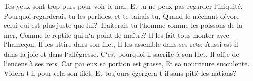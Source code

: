 \verse Tes yeux sont trop purs pour voir le mal, Et tu ne peux pas regarder l`iniquité. Pourquoi regarderais-tu les perfides, et te tairais-tu, Quand le méchant dévore celui qui est plus juste que lui? 
\verse Traiterais-tu l`homme comme les poissons de la mer, Comme le reptile qui n`a point de maître? 
\verse Il les fait tous monter avec l`hameçon, Il les attire dans son filet, Il les assemble dans ses rets: Aussi est-il dans la joie et dans l`allégresse. 
\verse C`est pourquoi il sacrifie à son filet, Il offre de l`encens à ses rets; Car par eux sa portion est grasse, Et sa nourriture succulente. 
\verse Videra-t-il pour cela son filet, Et toujours égorgera-t-il sans pitié les nations? 

